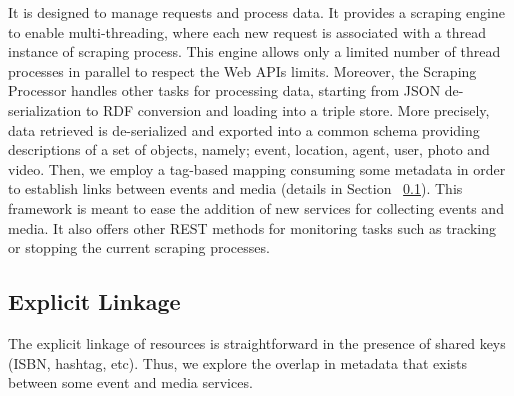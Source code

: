  It is designed to manage requests and process data. It provides a scraping engine to enable multi-threading, where each new request is associated with a thread instance of scraping process. This engine allows only a limited number of thread processes in parallel to respect the Web APIs limits. Moreover, the Scraping Processor handles other tasks for processing data, starting from JSON de-serialization to RDF conversion and loading into a triple store. More precisely, data retrieved is de-serialized and exported into a common schema providing descriptions of a set of objects, namely; event, location, agent, user, photo and video. Then, we employ a tag-based mapping consuming some metadata in order to establish links between events and media (details in Section ~\ref{sec:explicit-linkage}). This framework is meant to ease the addition of new services for collecting events and media. It also offers other REST methods for monitoring tasks such as tracking or stopping the current scraping processes.  

\subsection{Explicit Linkage} \label{sec:explicit-linkage}

The explicit linkage of resources is straightforward in the presence of shared keys (ISBN, hashtag, etc). Thus, we explore the overlap in metadata that exists between some event and media services.

